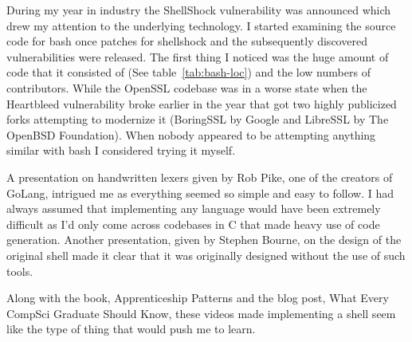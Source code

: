 During my year in industry the ShellShock\cite{SHELLSHOCK-CVE,SHELLSHOCK-LWN,SHELLSHOCK-SYMANTEC} vulnerability was announced which drew my attention to the underlying technology.
I started examining the source code for bash once patches for shellshock and the subsequently discovered vulnerabilities were released.
The first thing I noticed was the huge amount of code that it consisted of (See table~\ref{tab:bash-loc}) and the low numbers of contributors.
While the OpenSSL codebase was in a worse state when the Heartbleed vulnerability broke earlier in the year that got two highly publicized forks attempting to modernize it (BoringSSL by Google\cite{BORINGSSL} and LibreSSL by The OpenBSD Foundation\cite{LIBRESSL}).
When nobody appeared to be attempting anything similar with bash I considered trying it myself.

A presentation on handwritten lexers\cite{PIKE-LEXING-VIDEO} given by Rob Pike, one of the creators of GoLang, intrigued me as everything seemed so simple and easy to follow. 
I had always assumed that implementing any language would have been extremely difficult as I'd only come across codebases in C that made heavy use of code generation.
Another presentation, given by Stephen Bourne, on the design of the original shell\cite{DESIGN-OF-SH-VIDEO} made it clear that it was originally designed without the use of such tools.

Along with the book, Apprenticeship Patterns\cite{APPRENTICESHIP-PATTERNS} and the blog post, What Every CompSci Graduate Should Know\cite{EVERY-COMPSCI-GRAD}, these videos made implementing a shell seem like the type of thing that would push me to learn.

